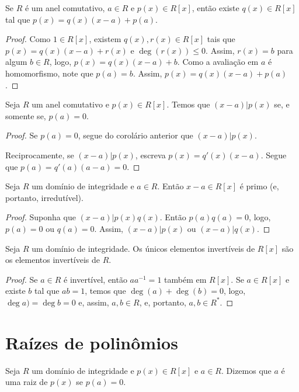 \begin{corol}
Se $R$ é um anel comutativo, $a \in R$ e $p(x)\in R[x]$, então existe $q(x)\in R[x]$ tal que $p(x)=q(x)(x-a)+p(a)$.
\end{corol}
\begin{proof}
    Como $1 \in R[x]$, existem $q(x), r(x) \in R[x]$ tais que $p(x)=q(x)(x-a)+r(x)$ e $\deg(r(x))\leq 0$. Assim, $r(x)=b$ para algum $b \in R$, logo, $p(x)=q(x)(x-a)+b$. Como a avaliação em $a$ é homomorfismo, note que $p(a)=b$. Assim, $p(x)=q(x)(x-a)+p(a)$.
\end{proof}
\begin{prop}
    Seja $R$ um anel comutativo e $p(x)\in R[x]$.
    Temos que $(x-a)|p(x)$ se, e somente se, $p(a)=0$.
\end{prop}
\begin{proof}
    Se $p(a)=0$, segue do corolário anterior que $(x-a)|p(x)$.

    Reciprocamente, se $(x-a)|p(x)$, escreva $p(x)=q'(x)(x-a)$. Segue que $p(a)=q'(a)(a-a)=0$.
\end{proof}

\begin{corol}
Seja $R$ um domínio de integridade e $a \in R$. Então $x-a\in R[x]$ é primo (e, portanto, irredutível).
\end{corol}
\begin{proof}
Suponha que $(x-a)|p(x)q(x)$. Então $p(a)q(a)=0$, logo, $p(a)=0$ ou $q(a)=0$. Assim, $(x-a)|p(x)$ ou $(x-a)|q(x)$.
\end{proof}

\begin{prop}
Seja $R$ um domínio de integridade. Os únicos elementos invertíveis de $R[x]$ são os elementos invertíveis de $R$.
\end{prop}
\begin{proof}
    Se $a \in R$ é invertível, então $aa^{-1}=1$ também em $R[x]$.
    Se $a \in R[x]$ e existe $b$ tal que $ab=1$, temos que $\deg(a)+\deg(b)=0$, logo, $\deg a)=\deg b=0$ e, assim, $a, b \in R$, e, portanto, $a, b \in R^*$.
\end{proof}
\section{Raízes de polinômios}
\begin{definition}
Seja $R$ um domínio de integridade e $p(x)\in R[x]$ e $a \in R$. Dizemos que $a$ é uma raiz de $p(x)$ se $p(a)=0$.
\end{definition}

